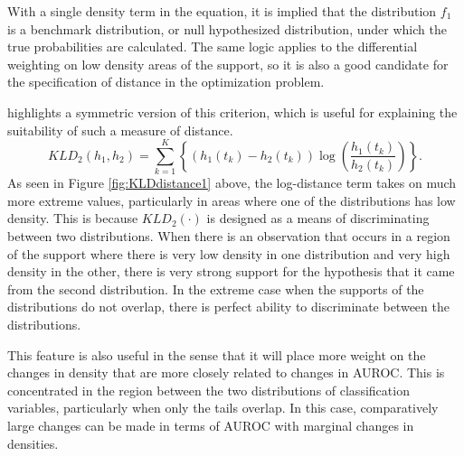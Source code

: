 With a single density term in the equation, it is implied that the distribution $f_1$ is a benchmark distribution, or null hypothesized distribution, under which the true probabilities are calculated.
The same logic applies to the differential weighting on low density areas of the support, so it is also a good candidate for the specification of distance in the optimization problem.





\citet{bigi2003chapter} highlights a symmetric version of this criterion, which is useful for explaining the suitability of such a measure of distance.
%
\begin{equation}
    KLD_2(h_1, h_2) = \sum_{k = 1}^{K} \left\{ \left( h_1(t_k) - h_2(t_k) \right)
        \log \left( \frac{h_1(t_k)}{h_2(t_k)} \right) \right\}.
\end{equation}
%
% 
As seen in Figure \ref{fig:KLDdistance1} above, the log-distance term takes on much more extreme values, particularly in areas where one of the distributions has low density.
This is because $KLD_2(\cdot)$ is designed as a means of discriminating between two distributions.
When there is an observation that occurs in a region of the support where there is very low density in one distribution and very high density in the other, there is very strong support for the hypothesis that it came from the second distribution.
In the extreme case when the supports of the distributions do not overlap, there is perfect ability to discriminate between the distributions.

This feature is also useful in the sense that it will place more weight on the changes in density that are more closely related to changes in AUROC.
This is concentrated in the region between the two distributions of classification variables, particularly when only the tails overlap.
In this case, comparatively large changes can be made in terms of AUROC with marginal changes in densities.







